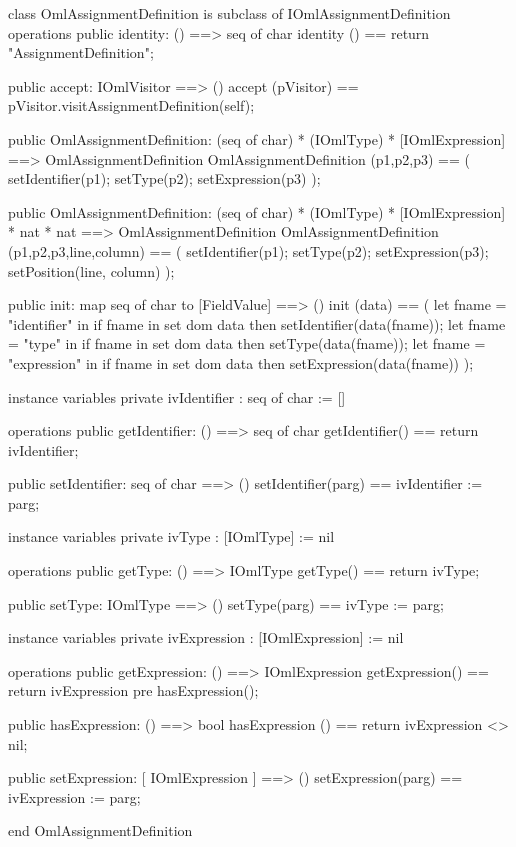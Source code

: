 \begin{vdm_al}
class OmlAssignmentDefinition is subclass of IOmlAssignmentDefinition
operations
  public identity: () ==> seq of char
  identity () == return "AssignmentDefinition";

  public accept: IOmlVisitor ==> ()
  accept (pVisitor) == pVisitor.visitAssignmentDefinition(self);

  public OmlAssignmentDefinition:
    (seq of char) *
    (IOmlType) *
    [IOmlExpression] ==> OmlAssignmentDefinition
  OmlAssignmentDefinition (p1,p2,p3) == 
    ( setIdentifier(p1);
      setType(p2);
      setExpression(p3) );

  public OmlAssignmentDefinition:
    (seq of char) *
    (IOmlType) *
    [IOmlExpression] *
    nat *
    nat ==> OmlAssignmentDefinition
  OmlAssignmentDefinition (p1,p2,p3,line,column) == 
    ( setIdentifier(p1);
      setType(p2);
      setExpression(p3);
      setPosition(line, column) );

  public init: map seq of char to [FieldValue] ==> ()
  init (data) ==
    ( let fname = "identifier" in
        if fname in set dom data
        then setIdentifier(data(fname));
      let fname = "type" in
        if fname in set dom data
        then setType(data(fname));
      let fname = "expression" in
        if fname in set dom data
        then setExpression(data(fname)) );

instance variables
  private ivIdentifier : seq of char := []

operations
  public getIdentifier: () ==> seq of char
  getIdentifier() == return ivIdentifier;

  public setIdentifier: seq of char ==> ()
  setIdentifier(parg) == ivIdentifier := parg;

instance variables
  private ivType : [IOmlType] := nil

operations
  public getType: () ==> IOmlType
  getType() == return ivType;

  public setType: IOmlType ==> ()
  setType(parg) == ivType := parg;

instance variables
  private ivExpression : [IOmlExpression] := nil

operations
  public getExpression: () ==> IOmlExpression
  getExpression() == return ivExpression
    pre hasExpression();

  public hasExpression: () ==> bool
  hasExpression () == return ivExpression <> nil;

  public setExpression: [ IOmlExpression ] ==> ()
  setExpression(parg) == ivExpression := parg;

end OmlAssignmentDefinition
\end{vdm_al}

